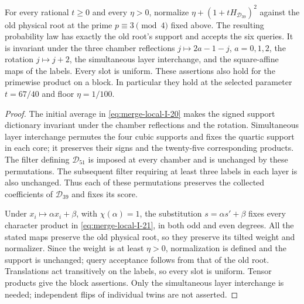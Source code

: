 \begin{lemma}
\label{lem:imp:coherent39-law}
For every rational $t\ge0$ and every $\eta>0$, normalize
$\eta+(1+tH_{\mathcal D_{39}})^2$ against the old physical root at the prime $p\equiv3\pmod4$ fixed above.
The resulting probability law has exactly the old root's support
and accepts the six queries. It is invariant under the three
chamber reflections $j\mapsto2a-1-j$, $a=0,1,2$, the rotation
$j\mapsto j+2$, the simultaneous layer interchange, and the
square-affine maps of the labels. Every slot is uniform.
These assertions also hold for the primewise product on a block.
In particular they hold at the selected parameter $t=67/40$ and
floor $\eta=1/100$.
\end{lemma}

\begin{proof}
The initial average in \eqref{eq:merge-local-I-20} makes the signed
support dictionary invariant under the chamber reflections and
the rotation. Simultaneous layer interchange permutes the four
cubic supports and fixes the quartic support in each core; it
preserves their signs and the twenty-five corresponding products.
The filter defining $\mathcal D_{51}$ is imposed at every chamber
and is unchanged by these permutations. The subsequent filter
requiring at least three labels in each layer is also unchanged.
Thus each of these permutations preserves the collected
coefficients of $\mathcal D_{39}$ and fixes its score.

Under $x_i\mapsto\alpha x_i+\beta$, with $\chi(\alpha)=1$,
the substitution $s=\alpha s'+\beta$ fixes every character
product in \eqref{eq:merge-local-I-21}, in both odd and even
degrees. All the stated maps preserve the old physical root,
so they preserve its tilted weight and normalizer. Since the
weight is at least $\eta>0$, normalization is defined and the
support is unchanged; query acceptance follows from that of
the old root. Translations act transitively on the labels,
so every slot is uniform. Tensor products give the block
assertions. Only the simultaneous layer interchange is needed;
independent flips of individual twins are not asserted.
\end{proof}

